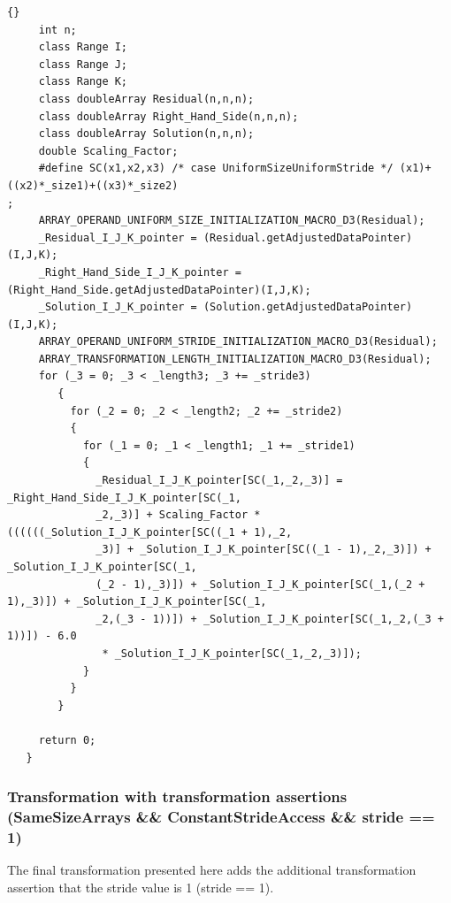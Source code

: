 \documentclass[10pt]{article}
\begin{document}
\begin{lstlisting}{}
     int n;
     class Range I;
     class Range J;
     class Range K;
     class doubleArray Residual(n,n,n);
     class doubleArray Right_Hand_Side(n,n,n);
     class doubleArray Solution(n,n,n);
     double Scaling_Factor; 
     #define SC(x1,x2,x3) /* case UniformSizeUniformStride */ (x1)+((x2)*_size1)+((x3)*_size2)
; 
     ARRAY_OPERAND_UNIFORM_SIZE_INITIALIZATION_MACRO_D3(Residual); 
     _Residual_I_J_K_pointer = (Residual.getAdjustedDataPointer)(I,J,K); 
     _Right_Hand_Side_I_J_K_pointer = (Right_Hand_Side.getAdjustedDataPointer)(I,J,K); 
     _Solution_I_J_K_pointer = (Solution.getAdjustedDataPointer)(I,J,K); 
     ARRAY_OPERAND_UNIFORM_STRIDE_INITIALIZATION_MACRO_D3(Residual); 
     ARRAY_TRANSFORMATION_LENGTH_INITIALIZATION_MACRO_D3(Residual); 
     for (_3 = 0; _3 < _length3; _3 += _stride3)
        { 
          for (_2 = 0; _2 < _length2; _2 += _stride2)
          { 
            for (_1 = 0; _1 < _length1; _1 += _stride1)
            { 
              _Residual_I_J_K_pointer[SC(_1,_2,_3)] = _Right_Hand_Side_I_J_K_pointer[SC(_1,
              _2,_3)] + Scaling_Factor * ((((((_Solution_I_J_K_pointer[SC((_1 + 1),_2,
              _3)] + _Solution_I_J_K_pointer[SC((_1 - 1),_2,_3)]) + _Solution_I_J_K_pointer[SC(_1,
              (_2 - 1),_3)]) + _Solution_I_J_K_pointer[SC(_1,(_2 + 1),_3)]) + _Solution_I_J_K_pointer[SC(_1,
              _2,(_3 - 1))]) + _Solution_I_J_K_pointer[SC(_1,_2,(_3 + 1))]) - 6.0
               * _Solution_I_J_K_pointer[SC(_1,_2,_3)]); 
            } 
          } 
        } 

     return 0;
   } 

\end{lstlisting}


\subsubsection{Transformation with transformation assertions (SameSizeArrays \&\& ConstantStrideAccess \&\& stride == 1)}

   The final transformation presented here adds the additional transformation assertion that the
stride value is 1 (stride == 1).
\end{document}
